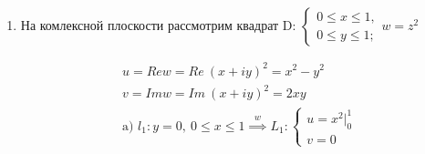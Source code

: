 \documentclass[../../main.tex]{subfiles}
\begin{document}
\begin{examples}
\begin{enumerate}
\[\begin{gathered}
\text{Длина }L \stackrel{\eqref{lec30:1}}{=}
\left[
  \begin{array}{ccc}
     f^\prime\left(z\right) = \left(z^2\right) = 2z
  \end{array}
\right]
= \int\limits_l{2|z|\ |dz|} = 
\left[
  \begin{array}{ccc}
     z = 1 + iy\\
     y|_{-1}^1
  \end{array}
\right]
=  
\left[
  \begin{array}{ccc}
     |z| = \sqrt{1 + y^2}\\
     dz = idy \implies |dz| = dy
  \end{array}
\right]\\
= 2 \int\limits_{-1}^1{\sqrt{1 + y^2}\ dy} = 
4\int\limits_0^1{\sqrt{1 + y^2}\ dy} = 4
\left[
  \begin{array}{ccc}
     \sqrt{1 + y^2} + ln(y + \sqrt{1 + y^2})
  \end{array}
\right]_0^1 = 
4(\sqrt{2} + ln(1 + \sqrt{2}))
\end{gathered}\]


\item На комлексной плоскости рассмотрим квадрат D:
$\begin{cases}
    0 \leqslant x \leqslant 1,\\
    0 \leqslant y \leqslant 1;
\end{cases} w = z^2$



\[\begin{gathered}
u = Re w = Re\ (x + iy)^2 = x^2 - y^2 \\
v = Im w = Im\ (x + iy)^2 = 2xy\\
    \text{a) }  l_1: y = 0,\ 0 \leqslant x \leqslant 1 \stackrel{w}{\implies}
L_1:
\begin{cases}
    u = x^2|_0^1\\
    v = 0
\end{cases}
\end{gathered}\]



\end{enumerate}
\end{examples}
\end{document}
